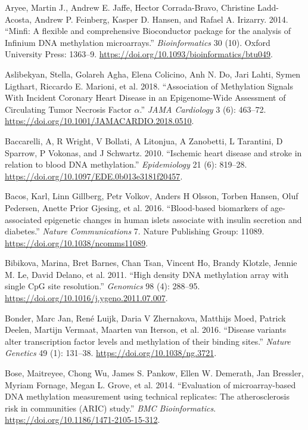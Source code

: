 \documentclass[]{article}
\begin{document}
\leavevmode\hypertarget{ref-Aryee2014}{}%
Aryee, Martin J., Andrew E. Jaffe, Hector Corrada-Bravo, Christine
Ladd-Acosta, Andrew P. Feinberg, Kasper D. Hansen, and Rafael A.
Irizarry. 2014. ``Minfi: A flexible and comprehensive Bioconductor
package for the analysis of Infinium DNA methylation microarrays.''
\emph{Bioinformatics} 30 (10). Oxford University Press: 1363--9.
\url{https://doi.org/10.1093/bioinformatics/btu049}.

\leavevmode\hypertarget{ref-Aslibekyan2018}{}%
Aslibekyan, Stella, Golareh Agha, Elena Colicino, Anh N. Do, Jari Lahti,
Symen Ligthart, Riccardo E. Marioni, et al. 2018. ``Association of
Methylation Signals With Incident Coronary Heart Disease in an
Epigenome-Wide Assessment of Circulating Tumor Necrosis Factor
\(\alpha\).'' \emph{JAMA Cardiology} 3 (6): 463--72.
\url{https://doi.org/10.1001/JAMACARDIO.2018.0510}.

\leavevmode\hypertarget{ref-Baccarelli2010}{}%
Baccarelli, A, R Wright, V Bollati, A Litonjua, A Zanobetti, L
Tarantini, D Sparrow, P Vokonas, and J Schwartz. 2010. ``Ischemic heart
disease and stroke in relation to blood DNA methylation.''
\emph{Epidemiology} 21 (6): 819--28.
\url{https://doi.org/10.1097/EDE.0b013e3181f20457}.

\leavevmode\hypertarget{ref-Bacos2016}{}%
Bacos, Karl, Linn Gillberg, Petr Volkov, Anders H Olsson, Torben Hansen,
Oluf Pedersen, Anette Prior Gjesing, et al. 2016. ``Blood-based
biomarkers of age-associated epigenetic changes in human islets
associate with insulin secretion and diabetes.'' \emph{Nature
Communications} 7. Nature Publishing Group: 11089.
\url{https://doi.org/10.1038/ncomms11089}.

\leavevmode\hypertarget{ref-Bibikova2011}{}%
Bibikova, Marina, Bret Barnes, Chan Tsan, Vincent Ho, Brandy Klotzle,
Jennie M. Le, David Delano, et al. 2011. ``High density DNA methylation
array with single CpG site resolution.'' \emph{Genomics} 98 (4):
288--95. \url{https://doi.org/10.1016/j.ygeno.2011.07.007}.

\leavevmode\hypertarget{ref-Bonder2016}{}%
Bonder, Marc Jan, René Luijk, Daria V Zhernakova, Matthijs Moed, Patrick
Deelen, Martijn Vermaat, Maarten van Iterson, et al. 2016. ``Disease
variants alter transcription factor levels and methylation of their
binding sites.'' \emph{Nature Genetics} 49 (1): 131--38.
\url{https://doi.org/10.1038/ng.3721}.

\leavevmode\hypertarget{ref-Bose2014}{}%
Bose, Maitreyee, Chong Wu, James S. Pankow, Ellen W. Demerath, Jan
Bressler, Myriam Fornage, Megan L. Grove, et al. 2014. ``Evaluation of
microarray-based DNA methylation measurement using technical replicates:
The atherosclerosis risk in communities (ARIC) study.'' \emph{BMC
Bioinformatics}. \url{https://doi.org/10.1186/1471-2105-15-312}.
\end{document}
